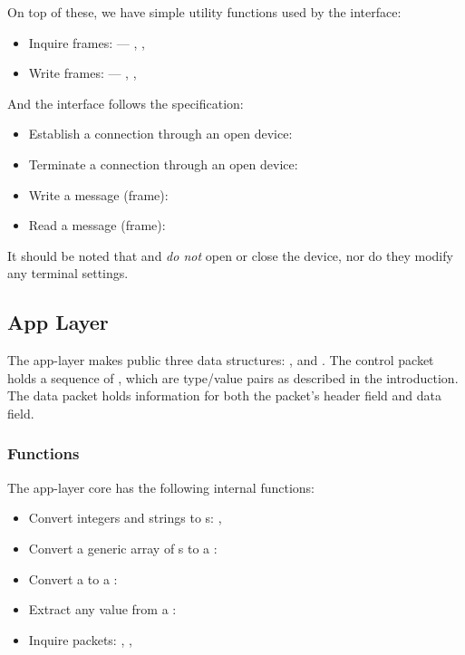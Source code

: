 \documentclass[main.tex]{subfiles}
\begin{document}
On top of these, we have simple utility functions used by the interface:

\begin{itemize}[noitemsep,rightmargin=3em]
\item Inquire frames:  --- , , \textellipsis
\item Write frames:  --- , , \textellipsis
\end{itemize}

And the interface follows the specification:

\begin{itemize}[noitemsep,rightmargin=3em]
	\item Establish a connection through an open device: 
	\item Terminate a connection through an open device: 
	\item Write a message (frame): 
	\item Read a message (frame): 
\end{itemize}

It should be noted that  and  \emph{do not} open or close the device, nor do they modify any terminal settings.

\subsection{App Layer}
\label{subsec:alarch}

The app-layer makes public three data structures: ,  and . The control packet holds a sequence of , which are type/value pairs as described in the introduction. The data packet holds information for both the packet's header field and data field.

\subsubsection{Functions}
\label{subsubsec:funcalarch}

The app-layer core has the following internal functions:

\begin{itemize}[noitemsep,rightmargin=3em]
	\item Convert integers and strings to s: , 
	\item Convert a generic array of s to a : 
	\item Convert a  to a : 
	\item Extract any  value from a : 
	\item Inquire packets: , , 
\end{itemize}
\end{document}
